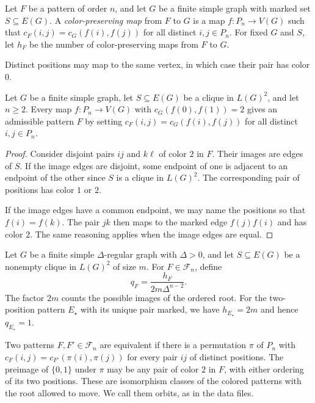 \begin{defn}\label{def:color-preserving-maps}
Let $F$ be a pattern of order $n$, and let $G$ be a finite simple graph
with marked set $S\subseteq E(G)$. A \emph{color-preserving map} from $F$
to $G$ is a map $f\colon P_n\to V(G)$ such that
$c_F(i,j)=c_G(f(i),f(j))$ for all distinct $i,j\in P_n$.
For fixed $G$ and $S$, let $h_F$ be the number of color-preserving maps
from $F$ to $G$.
\end{defn}

Distinct positions may map to the same vertex, in which case their
pair has color $0$.

\begin{lemma}\label{lem:pullback}
Let $G$ be a finite simple graph, let $S\subseteq E(G)$ be a clique
in $L(G)^2$, and let $n\geq 2$. Every map $f\colon P_n\to V(G)$ with
$c_G(f(0),f(1))=2$ gives an admissible pattern $F$ by setting
$c_F(i,j)=c_G(f(i),f(j))$ for all distinct $i,j\in P_n$.
\end{lemma}

\begin{proof}
Consider disjoint pairs $ij$ and $k\ell$ of color $2$ in $F$. Their
images are edges of $S$. If the image edges are disjoint, some
endpoint of one is adjacent to an endpoint of the other since $S$
is a clique in $L(G)^2$. The corresponding pair of positions has
color $1$ or $2$.

If the image edges have a common endpoint, we may name the positions
so that $f(i)=f(k)$. The pair $jk$ then maps to the marked edge
$f(j)f(i)$ and has color $2$. The same reasoning applies when the
image edges are equal.
\end{proof}

Let $G$ be a finite simple $\Delta$-regular graph with $\Delta>0$,
and let $S\subseteq E(G)$ be a nonempty clique in $L(G)^2$ of size $m$.
For $F\in\mathcal F_n$, define
\begin{equation}\label{eq:q-definition}
 q_F=\frac{h_F}{2m\Delta^{n-2}}.
\end{equation}
The factor $2m$ counts the possible images of the ordered root.
For the two-position pattern $E_\star$ with its unique pair marked,
we have $h_{E_\star}=2m$ and hence $q_{E_\star}=1$.

Two patterns $F,F'\in\mathcal F_n$ are equivalent if there is a
permutation $\pi$ of $P_n$ with
$c_F(i,j)=c_{F'}(\pi(i),\pi(j))$ for every pair $ij$ of distinct
positions. The preimage of $\{0,1\}$ under $\pi$ may be any pair of
color $2$ in $F$, with either ordering of its two positions. These
are isomorphism classes of the colored patterns with the root allowed
to move. We call them orbits, as in the data files.

